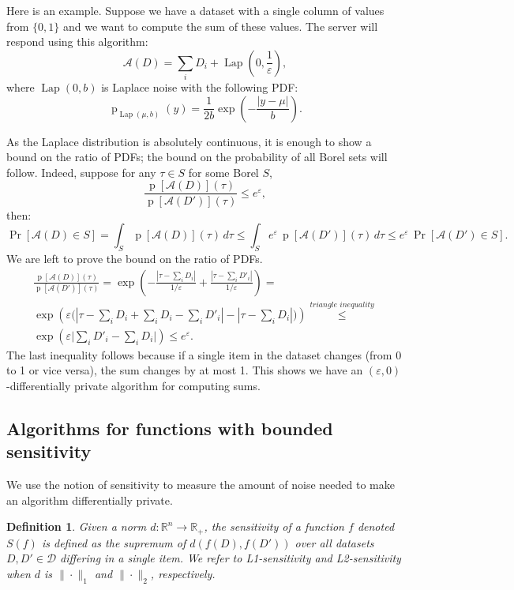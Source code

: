 \documentclass[12pt,letterpaper]{article}
\newcommand{\R}{\mathbb{R}}
\let\eps\varepsilon
\newcommand{\p}{\operatorname{p}}
\newtheorem{definition}{Definition}
\begin{document}
Here is an example. Suppose we have a dataset with a single column of values from $\{0, 1\}$ and we want to compute the sum of these values. The server will respond using this algorithm:
$$
\mathcal{A}(D) = \sum_i D_i + \operatorname{Lap}\left(0, \frac{1}{\eps}\right),
$$
where $\operatorname{Lap}(0, b)$ is Laplace noise with the following PDF:
$$
\p_{\operatorname{Lap}(\mu, b)}(y) = \frac{1}{2b}\exp\!\left(-\frac{|y - \mu|}{b}\right).
$$

As the Laplace distribution is absolutely continuous, it is enough to show a bound on the ratio of PDFs; the bound on the probability of all Borel sets will follow. Indeed, suppose for any $\tau \in S$ for some Borel $S$,
$$\frac{\p[\mathcal{A}(D)](\tau)}{\p[\mathcal{A}(D')](\tau)} \leq e^{\eps},$$
then:
$$\Pr[\mathcal{A}(D) \in S] = \int_{S}\p[\mathcal{A}(D)](\tau)\,d\tau \leq \int_{S} e^{\eps} \, \p[\mathcal{A}(D')](\tau)\,d\tau \leq e^{\eps} \, \Pr[\mathcal{A}(D') \in S].$$
We are left to prove the bound on the ratio of PDFs.
\begin{multline*}
\frac{\p[\mathcal{A}(D)](\tau)}{\p[\mathcal{A}(D')](\tau)} = 
\exp\left(-\frac{|\tau - \sum_iD_i|}{1/\eps} + \frac{|\tau - \sum_iD'_i|}{1/\eps}\right) = \\
\exp\left(\eps\big(|\tau - \sum_iD_i + \sum_iD_i - \sum_iD'_i| - |\tau - \sum_iD_i|\big)\right) \overset{\textit{triangle inequality}}{\leq} \\
\exp\left(\eps\big|\sum_iD'_i - \sum_iD_i\big|\right) \leq e^{\eps}.
\end{multline*}
The last inequality follows because if a single item in the dataset changes (from 0 to 1 or vice versa), the sum changes by at most 1. This shows we have an $(\eps, 0)$-differentially private algorithm for computing sums.

\subsection{Algorithms for functions with bounded sensitivity}
We use the notion of sensitivity to measure the amount of noise needed to make an algorithm differentially private.

\begin{definition}
Given a norm $d: \R^n \to \R_+$, the sensitivity of a function $f$ denoted $S(f)$ is defined as the supremum of $d(f(D), f(D'))$ over all datasets $D, D' \in \mathcal{D}$ differing in a single item. We refer to L1-sensitivity and L2-sensitivity when $d$ is $\|\cdot\|_1$ and $\|\cdot\|_2$, respectively.
\end{definition}
\end{document}
